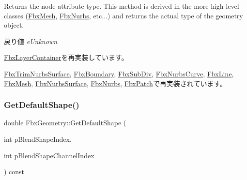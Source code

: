 Returns the node attribute type. This method is derived in the more high level classes (\hyperlink{class_fbx_mesh}{Fbx\+Mesh}, \hyperlink{class_fbx_nurbs}{Fbx\+Nurbs}, etc...) and returns the actual type of the geometry object.

\begin{DoxyReturn}{戻り値}
{\itshape e\+Unknown} 
\end{DoxyReturn}


\hyperlink{class_fbx_layer_container_a578a24bfcd49464813a4b5b08a12ec59}{Fbx\+Layer\+Container}を再実装しています。



\hyperlink{class_fbx_trim_nurbs_surface_a2d60f9613978db561ac32e2efff35104}{Fbx\+Trim\+Nurbs\+Surface}, \hyperlink{class_fbx_boundary_a093be9c6c0c0f13a337e9b6815aed9d0}{Fbx\+Boundary}, \hyperlink{class_fbx_sub_div_ac109cef6a177563eab80e28d414289a3}{Fbx\+Sub\+Div}, \hyperlink{class_fbx_nurbs_curve_aa6ec087af306c42ac814d43ea80c60b3}{Fbx\+Nurbs\+Curve}, \hyperlink{class_fbx_line_a3307097464d924b2c95c6687e41d69c9}{Fbx\+Line}, \hyperlink{class_fbx_mesh_a5a52e41ccf1382c40d3361ec3cfbb68a}{Fbx\+Mesh}, \hyperlink{class_fbx_nurbs_surface_a7c075984ec95a01b9cb6031e19cbd0cf}{Fbx\+Nurbs\+Surface}, \hyperlink{class_fbx_nurbs_a6c810e3a50538b346cbbf61338dca907}{Fbx\+Nurbs}, \hyperlink{class_fbx_patch_a4eb7de708949e012e0dcae2cb87a2ef4}{Fbx\+Patch}で再実装されています。

\mbox{\label{class_fbx_geometry_ae3dfb076c1d8729413588b4a934b036b}} 
\subsubsection{\texorpdfstring{Get\+Default\+Shape()}{GetDefaultShape()}\hspace{0.1cm}{\footnotesize\ttfamily [1/2]}}
{\footnotesize\ttfamily double Fbx\+Geometry\+::\+Get\+Default\+Shape (\begin{DoxyParamCaption}\item[{int}]{p\+Blend\+Shape\+Index,  }\item[{int}]{p\+Blend\+Shape\+Channel\+Index }\end{DoxyParamCaption}) const}

